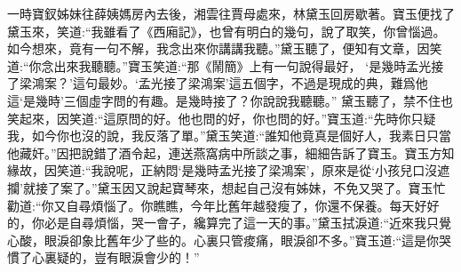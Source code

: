 \begin{parag}
    一時寶釵姊妹往薛姨媽房內去後，湘雲往賈母處來，林黛玉回房歇著。寶玉便找了黛玉來，笑道:“我雖看了《西廂記》，也曾有明白的幾句，說了取笑，你曾惱過。如今想來，竟有一句不解，我念出來你講講我聽。”黛玉聽了，便知有文章，因笑道:“你念出來我聽聽。”寶玉笑道:“那《鬧簡》上有一句說得最好， ‘是幾時孟光接了梁鴻案？’這句最妙。‘孟光接了梁鴻案’這五個字，不過是現成的典，難爲他這‘是幾時’三個虛字問的有趣。是幾時接了？你說說我聽聽。” 黛玉聽了，禁不住也笑起來，因笑道:“這原問的好。他也問的好，你也問的好。”寶玉道:“先時你只疑我，如今你也沒的說，我反落了單。”黛玉笑道:“誰知他竟真是個好人，我素日只當他藏奸。”因把說錯了酒令起，連送燕窩病中所談之事，細細告訴了寶玉。寶玉方知緣故，因笑道:“我說呢，正納悶‘是幾時孟光接了梁鴻案’，原來是從‘小孩兒口沒遮攔’就接了案了。”黛玉因又說起寶琴來，想起自己沒有姊妹，不免又哭了。寶玉忙勸道:“你又自尋煩惱了。你瞧瞧，今年比舊年越發瘦了，你還不保養。每天好好的，你必是自尋煩惱，哭一會子，纔算完了這一天的事。”黛玉拭淚道:“近來我只覺心酸，眼淚卻象比舊年少了些的。心裏只管痠痛，眼淚卻不多。”寶玉道:“這是你哭慣了心裏疑的，豈有眼淚會少的！”
\end{parag}


